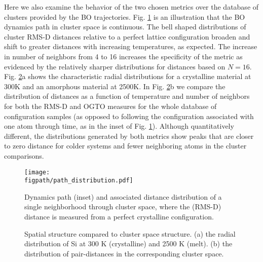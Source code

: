 \documentclass[journal=jctcce,manuscript=article]{achemso}
\newlength{\figwidth}
\newcommand{\figpath}{Figures}
\newcommand{\fref}[1]{{Fig. \ref{#1}}}
\begin{document}
Here we also examine the behavior of the two chosen metrics over the database of clusters provided by the BO trajectories.
\fref{fig:dynamics_path} is an illustration that the BO dynamics path in cluster space is continuous.
The bell shaped distributions of cluster RMS-D distances relative to a perfect lattice configuration broaden and shift to greater distances with increasing temperatures, as expected.
The increase in number of neighbors from 4 to 16 increases the specificity of the metric as evidenced by the relatively sharper distributions for distances based on $N=16$.
\fref{fig:spatial_vs_cluster}a shows the characteristic radial distributions for a crystalline material at 300K and an amorphous material at 2500K.
In \fref{fig:spatial_vs_cluster}b we compare the distribution of distances as a function of temperature and number of neighbors for both the RMS-D and OGTO measures for the whole database of configuration samples (as opposed to following the configuration associated with one atom through time, as in the inset of \fref{fig:dynamics_path}).
Although quantitatively different, the distributions generated by both metrics show peaks that are closer to zero distance for colder systems and fewer neighboring atoms in the cluster comparisons.


\begin{figure}[h]
{\texttt{[image: \\figpath/path\_distribution.pdf]}}
\caption{Dynamics path (inset) and associated distance distribution of a single neighborhood through cluster space, where the (RMS-D) distance is measured from a perfect crystalline configuration.}
\label{fig:dynamics_path}
\end{figure}
\begin{figure}[h]
\caption{
Spatial structure compared to cluster space structure.
(a) the radial distribution of Si at 300 K (crystalline) and 2500 K (melt).
(b) the distribution of pair-distances in the corresponding cluster space.
}
\label{fig:spatial_vs_cluster}
\end{figure}

\end{document}
